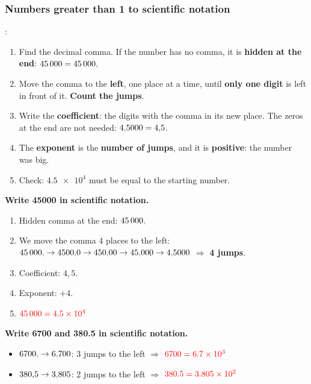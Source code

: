 \subsubsection{Numbers greater than 1 to scientific notation}

:
\begin{enumerate}[label=\numberballmDarkTeal]
    \item Find the decimal comma. If the number has no comma, it is \textbf{hidden at the end}: \(45\,000 = 45\,000\textcolor{red}{\mathbf{,}}\)
    \item Move the comma to the \textbf{left}, one place at a time, until \textbf{only one digit} is left in front of it. \textbf{Count the jumps}.
    \item Write the \textbf{coefficient}: the digits with the comma in its new place. The zeros at the end are not needed: \(4\textcolor{red}{\mathbf{,}} 5000 = 4{,}5\).
    \item The \textbf{exponent} is the \textbf{number of jumps}, and it is \textbf{positive}: the number was big.
    \item Check: \(\num{4.5e4}\) must be equal to the starting number.
\end{enumerate}

\begin{example}
    \textbf{Write \num{45000} in scientific notation.}
    \begin{enumerate}[label=\numberballmDarkTeal]
        \item Hidden comma at the end: \(45\,000\textcolor{red}{\mathbf{,}}\)
        \item We move the comma 4 places to the left: \(45\,000\textcolor{red}{\mathbf{,}} \to 4500\textcolor{red}{\mathbf{,}} 0 \to 450\textcolor{red}{\mathbf{,}} 00 \to 45\textcolor{red}{\mathbf{,}} 000 \to 4\textcolor{red}{\mathbf{,}} 5000\) \(\Rightarrow\) \textbf{4 jumps}.
        \item Coefficient: \(4{,}5\).
        \item Exponent: \(+4\).
        \item \(\textcolor{red}{\num{45000} = \num{4.5e4}}\)
    \end{enumerate}
\end{example}

\begin{example}
    \textbf{Write \num{6700} and \num{380.5} in scientific notation.}
    \begin{itemize}
        \item \(6700\textcolor{red}{\mathbf{,}} \to 6\textcolor{red}{\mathbf{,}} 700\): 3 jumps to the left \(\Rightarrow\) \(\textcolor{red}{\num{6700} = \num{6.7e3}}\)
        \item \(380{,}5 \to 3\textcolor{red}{\mathbf{,}} 805\): 2 jumps to the left \(\Rightarrow\) \(\textcolor{red}{\num{380.5} = \num{3.805e2}}\)
    \end{itemize}
\end{example}

